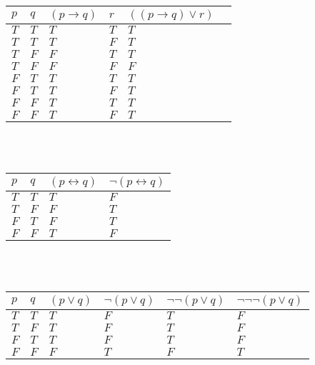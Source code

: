 \documentclass{article}%
\begin{document}
\begin{tabular}{l | l | l | l | l | l}
    $p$ & $q$ & $(p \rightarrow q)$ & $r$ & $((p \rightarrow q) \vee r)$ \\ \hline
    $T$ & $T$ & $T$                 & $T$ & $T$ \\ \hline
    $T$ & $T$ & $T$                 & $F$ & $T$ \\ \hline
    $T$ & $F$ & $F$                 & $T$ & $T$ \\ \hline
    $T$ & $F$ & $F$                 & $F$ & $F$ \\ \hline
    $F$ & $T$ & $T$                 & $T$ & $T$ \\ \hline
    $F$ & $T$ & $T$                 & $F$ & $T$ \\ \hline
    $F$ & $F$ & $T$                 & $T$ & $T$ \\ \hline
    $F$ & $F$ & $T$                 & $F$ & $T$ \\
    \hline
\end{tabular}\\
\\
\vspace{4mm}
\begin{tabular}{l | l | l | l |}
    $p$ & $q$ & $(p \leftrightarrow q)$ & $\neg (p \leftrightarrow q)$ \\ \hline
    $T$ & $T$ & $T$                     & $F$ \\ \hline
    $T$ & $F$ & $F$                     & $T$ \\ \hline
    $F$ & $T$ & $F$                     & $T$ \\ \hline
    $F$ & $F$ & $T$                     & $F$ \\
    \hline
\end{tabular}\\
\\
\vspace{4mm}
\begin{tabular}{l | l | l | l | l | l |}
    $p$ & $q$ & $(p \vee q)$            & $\neg (p \vee q)$             & $\neg \neg (p \vee q)$                & $\neg \neg \neg (p \vee q)$\\ \hline
    $T$ & $T$ & $T$                     & $F$                           & $T$                                   & $F$ \\ \hline
    $T$ & $F$ & $T$                     & $F$                           & $T$                                   & $F$ \\ \hline
    $F$ & $T$ & $T$                     & $F$                           & $T$                                   & $F$ \\ \hline
    $F$ & $F$ & $F$                     & $T$                           & $F$                                   & $T$ \\
    \hline
\end{tabular}\\
\end{document}

